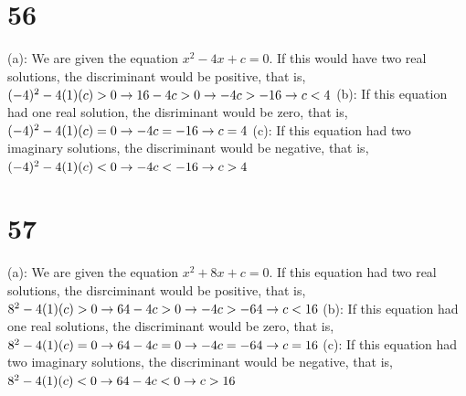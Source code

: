 \documentclass{article}
\theoremstyle{definition}
\begin{document}
\section*{56}
(a): We are given the equation $x^2-4x+c=0$. If this would have two real solutions, the discriminant would be positive, that is, 
$(-4)^2-4(1)(c)>0\newline\rightarrow 
16-4c>0\newline\rightarrow 
-4c>-16\newline\rightarrow 
c<4$\newline
(b): If this equation had one real solution, the disriminant would be zero, that is,
$(-4)^2-4(1)(c)=0\newline\rightarrow 
-4c=-16\newline\rightarrow 
c=4$\newline
(c): If this equation had two imaginary solutions, the discriminant would be negative, that is,
$(-4)^2-4(1)(c)<0\newline\rightarrow 
-4c<-16\newline\rightarrow 
c>4$

\section*{57}
(a): We are given the equation $x^2+8x+c=0$. If this equation had two real solutions, the disrciminant would be positive, that is, 
$8^2-4(1)(c)>0\newline\rightarrow 
64-4c>0\newline\rightarrow 
-4c>-64\newline\rightarrow 
c<16$\newline
(b): If this equation had one real solutions, the discriminant would be zero, that is,
$8^2-4(1)(c)=0\newline\rightarrow 
64-4c=0\newline\rightarrow 
-4c=-64\newline\rightarrow 
c=16$\newline
(c): If this equation had two imaginary solutions, the discriminant would be negative, that is, 
$8^2-4(1)(c)<0\newline\rightarrow 
64-4c<0\newline\rightarrow 
c>16$
\end{document}
